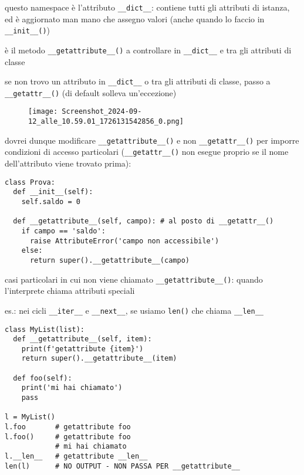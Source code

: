 questo namespace \`e l'attributo \texttt{__dict__}: contiene tutti gli attributi di istanza, ed \`e aggiornato man mano che assegno valori (anche quando lo faccio in \texttt{__init__()})

\`e il metodo \texttt{__getattribute__()} a controllare in \texttt{__dict__} e tra gli attributi di classe

se non trovo un attributo in \texttt{__dict__} o tra gli attributi di classe, passo a \texttt{__getattr__()} (di default solleva un'eccezione)

\begin{figure}[h]
\centering
\texttt{[image: Screenshot\_2024-09-12\_alle\_10.59.01\_1726131542856\_0.png]}
\end{figure}

dovrei dunque modificare \texttt{__getattribute__()} e non \texttt{__getattr__()} per imporre condizioni di accesso particolari (\texttt{__getattr__()} non esegue proprio se il nome dell'attributo viene trovato prima):

\begin{verbatim}
class Prova:
  def __init__(self):
    self.saldo = 0
    
  def __getattribute__(self, campo): # al posto di __getattr__()
    if campo == 'saldo':
      raise AttributeError('campo non accessibile')
    else:
      return super().__getattribute__(campo)
\end{verbatim}

casi particolari in cui non viene chiamato \texttt{__getattribute__()}: quando l'interprete chiama attributi speciali

es.: nei cicli \texttt{__iter__} e \texttt{__next__}, se usiamo \texttt{len()} che chiama \texttt{__len__}

\begin{verbatim}
class MyList(list):
  def __getattribute__(self, item):
    print(f'getattribute {item}')
    return super().__getattribute__(item)
  
  def foo(self):
    print('mi hai chiamato')
    pass

l = MyList()
l.foo 		# getattribute foo
l.foo() 	# getattribute foo
			# mi hai chiamato
l.__len__ 	# getattribute __len__
len(l)		# NO OUTPUT - NON PASSA PER __getattribute__
\end{verbatim}

